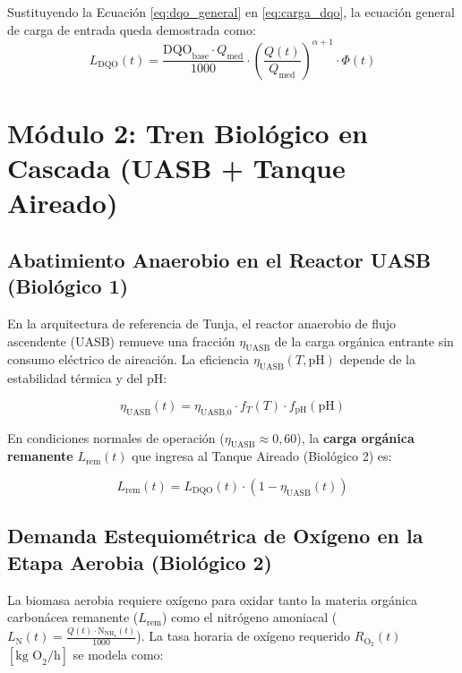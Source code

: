 \documentclass[11pt, a4paper]{article}
\begin{document}
Sustituyendo la Ecuación \eqref{eq:dqo_general} en \eqref{eq:carga_dqo}, la ecuación general de carga de entrada queda demostrada como:
\begin{equation}
    L_{\text{DQO}}(t) = \frac{\text{DQO}_{\text{base}} \cdot Q_{\text{med}}}{1000} \cdot \left(\frac{Q(t)}{Q_{\text{med}}}\right)^{\alpha + 1} \cdot \Phi(t)
    \label{eq:carga_general}
\end{equation}

\section{Módulo 2: Tren Biológico en Cascada (UASB + Tanque Aireado)}

\subsection{Abatimiento Anaerobio en el Reactor UASB (Biológico 1)}
En la arquitectura de referencia de Tunja, el reactor anaerobio de flujo ascendente (UASB) remueve una fracción $\eta_{\text{UASB}}$ de la carga orgánica entrante sin consumo eléctrico de aireación. La eficiencia $\eta_{\text{UASB}}(T, \text{pH})$ depende de la estabilidad térmica y del pH:

\begin{equation}
    \eta_{\text{UASB}}(t) = \eta_{\text{UASB,0}} \cdot f_T(T) \cdot f_{\text{pH}}(\text{pH})
\end{equation}

En condiciones normales de operación ($\eta_{\text{UASB}} \approx 0{,}60$), la \textbf{carga orgánica remanente} $L_{\text{rem}}(t)$ que ingresa al Tanque Aireado (Biológico 2) es:

\begin{equation}
    L_{\text{rem}}(t) = L_{\text{DQO}}(t) \cdot \left(1 - \eta_{\text{UASB}}(t)\right)
    \label{eq:carga_rem}
\end{equation}

\subsection{Demanda Estequiométrica de Oxígeno en la Etapa Aerobia (Biológico 2)}
La biomasa aerobia requiere oxígeno para oxidar tanto la materia orgánica carbonácea remanente ($L_{\text{rem}}$) como el nitrógeno amoniacal ($L_{\text{N}}(t) = \frac{Q(t) \cdot \text{N}_{\text{NH}_4}(t)}{1000}$). La tasa horaria de oxígeno requerido $R_{\text{O}_2}(t)$ $\left[\text{kg O}_2/\text{h}\right]$ se modela como:
\end{document}
